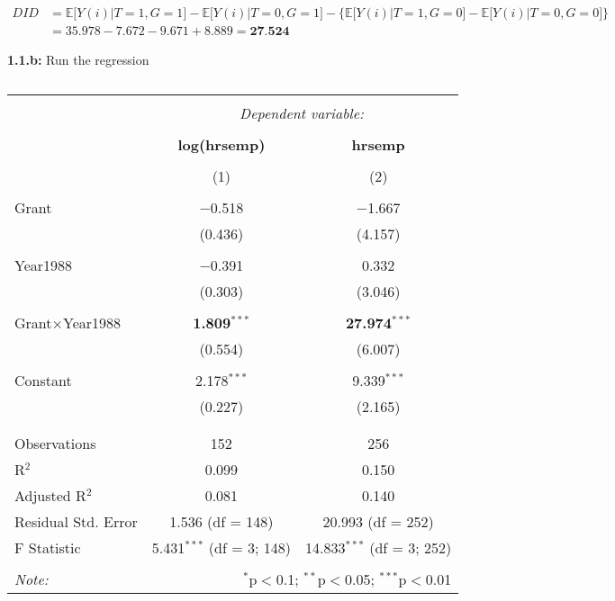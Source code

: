 \documentclass[a4paper]{article}
\begin{document}
\begin{align*}
DID &= \mathbb{E}\big[Y(i) | T = 1, G = 1 \big] - \mathbb{E}\big[Y(i) | T = 0, G = 1 \big] - \Big\{ \mathbb{E}\big[Y(i) | T = 1, G = 0 \big] - \mathbb{E}\big[Y(i) | T = 0, G = 0 \big] \Big\} \\
&= 35.978 - 7.672 - 9.671 + 8.889 = \textbf{27.524}
\end{align*}

\vspace{10cm}

\textbf{1.1.b:} Run the regression

\begin{table}[!htbp] \centering 
	\caption{} 
	\label{} 
	\begin{tabular}{@{\extracolsep{5pt}}lcc} 
		\\[-1.8ex]\hline 
		\hline \\[-1.8ex] 
		& \multicolumn{2}{c}{\textit{Dependent variable:}} \\ 
		\cline{2-3} 
		\\[-1.8ex] & \textbf{log(hrsemp)} & \textbf{hrsemp} \\ 
		\\[-1.8ex] & (1) & (2)\\ 
		\hline \\[-1.8ex] 
		Grant & $-$0.518 & $-$1.667 \\ 
		& (0.436) & (4.157) \\ 
		& & \\ 
		Year1988 & $-$0.391 & 0.332 \\ 
		& (0.303) & (3.046) \\ 
		& & \\ 
		Grant$\times$Year1988 & \textbf{1.809}$^{***}$ & \textbf{27.974}$^{***}$ \\ 
		& (0.554) & (6.007) \\ 
		& & \\ 
		Constant & 2.178$^{***}$ & 9.339$^{***}$ \\ 
		& (0.227) & (2.165) \\ 
		& & \\ 
		\hline \\[-1.8ex] 
		Observations & 152 & 256 \\ 
		R$^{2}$ & 0.099 & 0.150 \\ 
		Adjusted R$^{2}$ & 0.081 & 0.140 \\ 
		Residual Std. Error & 1.536 (df = 148) & 20.993 (df = 252) \\ 
		F Statistic & 5.431$^{***}$ (df = 3; 148) & 14.833$^{***}$ (df = 3; 252) \\ 
		\hline 
		\hline \\[-1.8ex] 
		\textit{Note:}  & \multicolumn{2}{r}{$^{*}$p$<$0.1; $^{**}$p$<$0.05; $^{***}$p$<$0.01} \\ 
	\end{tabular} 
\end{table} 
\end{document}
